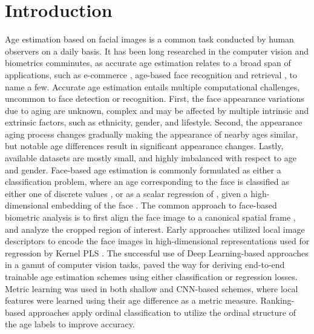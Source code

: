 \documentclass[10pt,twocolumn,letterpaper]{article}
\begin{document}
\section{Introduction}
\label{sec:introduction}
Age estimation based on facial images is a common task conducted by human
observers on a daily basis. It has been long researched in the computer
vision and biometrics comminutes, as accurate age estimation relates to a
broad span of applications, such as e-commerce \cite{Hakeem2012VideoAF},
age-based face recognition and retrieval \cite{Lanitis2004ComparingDC}, to
name a few. Accurate age estimation entails multiple computational
challenges, uncommon to face detection or recognition. First, the face
appearance variations due to aging are unknown, complex and may be affected
by multiple intrinsic and extrinsic factors, such as ethnicity, gender, and
lifestyle. Second, the appearance aging process changes gradually making the
appearance of nearby ages similar, but notable age differences result in
significant appearance changes. Lastly, available datasets are mostly small,
and highly imbalanced with respect to age and gender. Face-based age estimation is commonly formulated as either a classification
problem, where an age  corresponding to the face  is
classified as either one of  discrete values \cite {eidinger2014age,guo2011simultaneous,chang2011ordinal,ZhengSun2012,ramon2012gender,guo2010human}, or as a scalar regression of , given a high-dimensional embedding of the face  \cite {guo2011simultaneous,guo2010human,eidinger2014age,wang2015age,ChenGong2013,leviage,yi2015age}. The common approach to face-based biometric analysis is to first align the
face image to a canonical spatial frame \cite{RetinaFace}, and analyze the
cropped region of interest. Early approaches utilized local image
descriptors \cite{ramon2012gender} to encode the face images in
high-dimensional representations used for regression by Kernel PLS \cite {guo2011simultaneous}.
The successful use of Deep Learning-based approaches in a gamut of computer
vision tasks, paved the way for deriving end-to-end trainable age estimation
schemes \cite{8017500,deepage} using either classification or regression
losses. Metric learning was used in both shallow \cite{1640964} and
CNN-based \cite{8017500} schemes, where local features were learned using
their age difference as a metric measure. Ranking-based approaches \cite {8099569,7780901, 9145576, Dark_Knowledge} apply ordinal classification to
utilize the ordinal structure of the age labels to improve accuracy.
\end{document}
